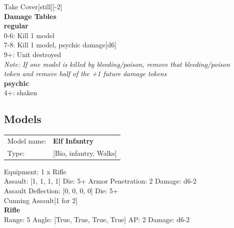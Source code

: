 Take Cover[still][-2]\\ 



{\bf Damage Tables} \\
 {\bf regular } \\
0-6: Kill 1 model \\
7-8: Kill 1 model, psychic damage[d6] \\
9+: Unit destroyed \\
{{\it Note: If one model is killed by bleeding/poison, remove that bleeding/poison \\ token and remove half of the +1 future damage tokens}} \\
 {\bf psychic } \\
4+: shaken \\


\clearpage

\subsection{ Models }

\begin{tabular}{ll}
Model name: & {\bf Elf Infantry } \\
Type: & [Bio, infantry, Walks] \\
\end{tabular}

Equipment: 1 x Rifle \\

Assault: [1, 1, 1, 1] Die: 5+ Armor Penetration: 2 Damage: d6-2 \\
Assault Deflection: [0, 0, 0, 0] Die: 5+\\
\indent Cunning Assault[1 for 2]\\ 
 



{\bf Rifle } \\



Range: 5  Angle: [True, True, True, True] AP: 2 Damage: d6-2 \\




 















